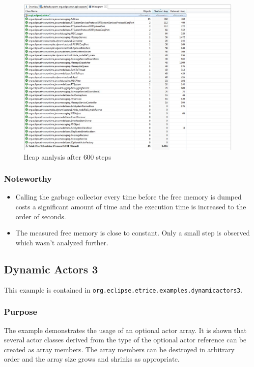 \begin{figure}
\includegraphics[scale=0.45]{images/039-DynAct2-HeapAnalysis.jpg}
\caption{Heap analysis after 600 steps}
\label{fig:dynact2_heap}
\end{figure}

\subsubsection{Noteworthy}

\begin{itemize}
\item Calling the garbage collector every time before the free memory is dumped
costs a significant amount of time and the execution time is increased to the order of seconds.
\item The measured free memory is close to constant. Only a small step is observed which wasn't analyzed further.
\end{itemize}

\subsection{Dynamic Actors 3}

This example is contained in \texttt{org.eclipse.etrice.examples.dynamicactors3}.

\subsubsection{Purpose}

The example demonstrates the usage of an optional actor array. It is shown that several actor classes
derived from the type of the optional actor reference can be created as array members.
The array members can be destroyed in arbitrary order and the array size grows and shrinks as appropriate.

